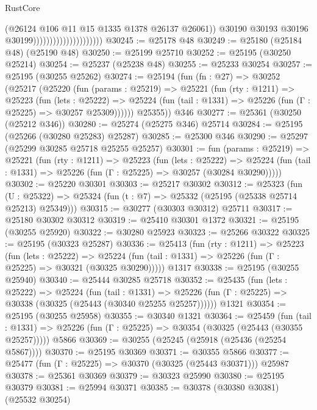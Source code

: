\begin{lexlean}{RustCore}
\begin{coremodule}
                                                (@26124 @106 @11 @15 @1335 @1378 @26137 @26061))
                                              @30190
                                              @30193
                                              @30196
                                              @30199)))))))))))))))))))))
@30245 := @25178 @48
@30249 := @25180 (@25184 @48) (@25190 @48)
@30250 := @25199 @25710
@30252 := @25195 (@30250 @25214)
@30254 := @25237 (@25238 @48)
@30255 := @25233 @30254
@30257 := @25195 (@30255 @25262)
@30274 := @25194
    (fun (fn : @27) =>
    @30252
      (@25217
        (@25220
          (fun (params : @25219) =>
          @25221
            (fun (rty : @1211) =>
            @25223
              (fun (lets : @25222) =>
              @25224 (fun (tail : @1331) => @25226 (fun (Γ : @25225) => @30257 @25309))))))
        @25355))
    @346
@30277 := @25361 (@30250 (@25212 @346))
@30280 := @25274 (@25275 @346) @25714
@30284 := @25195 (@25266 (@30280 @25283) @25287)
@30285 := @25300 @346
@30290 := @25297 (@25299 @30285 @25718 @25255 @25257)
@30301 := fun (params : @25219) =>
  @25221
    (fun (rty : @1211) =>
    @25223
      (fun (lets : @25222) =>
      @25224 (fun (tail : @1331) => @25226 (fun (Γ : @25225) => @30257 (@30284 @30290)))))
@30302 := @25220 @30301
@30303 := @25217 @30302
@30312 := @25323
    (fun (U : @25322) => @25324 (fun (t : @7) => @25332 (@25195 (@25338 @25714 @25213) @25349)))
@30315 := @30277 (@30303 @30312) @25711
@30317 := @25180 @30302 @30312
@30319 := @25410 @30301 @1372
@30321 := @25195 (@30255 @25920)
@30322 := @30280 @25923
@30323 := @25266 @30322
@30325 := @25195 (@30323 @25287)
@30336 := @25413
    (fun (rty : @1211) =>
    @25223
      (fun (lets : @25222) =>
      @25224 (fun (tail : @1331) => @25226 (fun (Γ : @25225) => @30321 (@30325 @30290)))))
    @1317
@30338 := @25195 (@30255 @25940)
@30340 := @25444 @30285 @25718
@30352 := @25435
    (fun (lets : @25222) =>
    @25224
      (fun (tail : @1331) =>
      @25226 (fun (Γ : @25225) => @30338 (@30325 (@25443 (@30340 @25255 @25257))))))
    @1321
@30354 := @25195 (@30255 @25958)
@30355 := @30340 @1321
@30364 := @25459
    (fun (tail : @1331) => @25226 (fun (Γ : @25225) => @30354 (@30325 (@25443 (@30355 @25257)))))
    @5866
@30369 := @30255 (@25245 (@25918 (@25436 (@25254 @5867))))
@30370 := @25195 @30369
@30371 := @30355 @5866
@30377 := @25477 (fun (Γ : @25225) => @30370 (@30325 (@25443 @30371))) @25987
@30378 := @25361 @30369
@30379 := @30323 @25990
@30380 := @25195 @30379
@30381 := @25994 @30371
@30385 := @30378 (@30380 @30381) (@25532 @30254)

\end{coremodule}
\end{lexlean}
